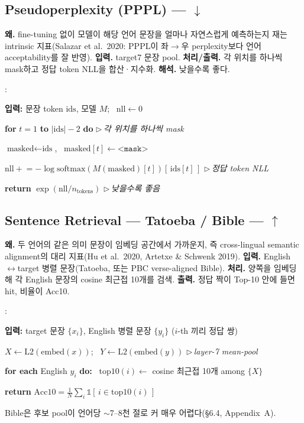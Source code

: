 \documentclass[11pt,a4paper]{article}
\newcounter{pcln}
\newenvironment{pcode}{%
  \begin{list}{\scriptsize\arabic{pcln}:}{%
    \usecounter{pcln}\small
    \setlength{\leftmargin}{2.2em}\setlength{\labelwidth}{1.6em}%
    \setlength{\itemsep}{1.5pt}\setlength{\parsep}{0pt}\setlength{\topsep}{3pt}}%
}{\end{list}}
\newcommand{\kw}[1]{\textbf{#1}}                       %
\newcommand{\ind}{\hspace*{1.3em}}                     %
\newcommand{\cmt}[1]{\hfill{\footnotesize$\triangleright$\,\textit{#1}}}  %
\newcommand{\dn}{$\downarrow$}
\newcommand{\up}{$\uparrow$}
\begin{document}
\subsection{Pseudoperplexity (PPPL) --- \dn}
\textbf{왜.} fine-tuning 없이 모델이 해당 언어 문장을 얼마나 자연스럽게 예측하는지 재는 intrinsic 지표(Salazar et al.\ 2020: PPPL이 좌$\to$우 perplexity보다 언어 acceptability를 잘 반영).
\textbf{입력.} target7 문장 pool. \textbf{처리/출력.} 각 위치를 하나씩 mask하고 정답 token NLL을 합산·지수화. \textbf{해석.} 낮을수록 좋다.
\begin{algorithm}[h]
\caption{Pseudoperplexity (PPPL)}
\begin{pcode}
\item \kw{입력:} 문장 token $\text{ids}$, 모델 $M$; \ $\text{nll} \gets 0$
\item \kw{for} $t = 1$ \kw{to} $|\text{ids}|-2$ \kw{do} \cmt{각 위치를 하나씩 mask}
\item \ind $\text{masked} \gets \text{ids}$, \ $\text{masked}[t] \gets \texttt{<mask>}$
\item \ind $\text{nll} \mathrel{+}= -\log\mathrm{softmax}(M(\text{masked})[t])[\,\text{ids}[t]\,]$ \cmt{정답 token NLL}
\item \kw{return} $\exp(\text{nll} / n_{\text{tokens}})$ \cmt{낮을수록 좋음}
\end{pcode}
\end{algorithm}

\subsection{Sentence Retrieval --- Tatoeba / Bible --- \up}
\textbf{왜.} 두 언어의 같은 의미 문장이 임베딩 공간에서 가까운지, 즉 cross-lingual semantic alignment의 대리 지표(Hu et al.\ 2020, Artetxe \& Schwenk 2019).
\textbf{입력.} English$\leftrightarrow$target 병렬 문장(Tatoeba, 또는 PBC verse-aligned Bible). \textbf{처리.} 양쪽을 임베딩해 각 English 문장의 cosine 최근접 10개를 검색. \textbf{출력.} 정답 짝이 Top-10 안에 들면 hit, 비율이 Acc10.
\begin{algorithm}[h]
\caption{Sentence Retrieval (Top-10 accuracy)}
\begin{pcode}
\item \kw{입력:} target 문장 $\{x_i\}$, English 병렬 문장 $\{y_i\}$ ($i$-th 끼리 정답 쌍)
\item $X \gets \text{L2}(\text{embed}(x))$; \ $Y \gets \text{L2}(\text{embed}(y))$ \cmt{layer-7 mean-pool}
\item \kw{for each} English $y_i$ \kw{do:} \ $\mathrm{top10}(i) \gets$ cosine 최근접 10개 among $\{X\}$
\item \kw{return} $\mathrm{Acc10} = \frac{1}{N}\sum_i \mathbb{1}[\,i \in \mathrm{top10}(i)\,]$
\end{pcode}
\end{algorithm}
Bible은 후보 pool이 언어당 $\sim$7--8천 절로 커 매우 어렵다(\S6.4, Appendix~A).
\end{document}
